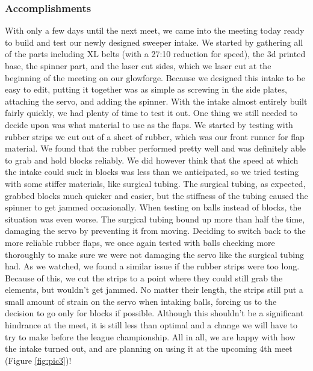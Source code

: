 \subsubsection*{Accomplishments}
With only a few days until the next meet, we came into the meeting today ready to build and test our newly designed sweeper intake. We started by gathering all of the parts including XL belts (with a 27:10 reduction for speed), the 3d printed base, the spinner part, and the laser cut sides, which we laser cut at the beginning of the meeting on our glowforge. Because we designed this intake to be easy to edit, putting it together was as simple as screwing in the side plates, attaching the servo, and adding the spinner. With the intake almost entirely built fairly quickly, we had plenty of time to test it out. One thing we still needed to decide upon was what material to use as the flaps. We started by testing with rubber strips we cut out of a sheet of rubber, which was our front runner for flap material. We found that the rubber performed pretty well and was definitely able to grab and hold blocks reliably. We did however think that the speed at which the intake could suck in blocks was less than we anticipated, so we tried testing with some stiffer materials, like surgical tubing. The surgical tubing, as expected, grabbed blocks much quicker and easier, but the stiffness of the tubing caused the spinner to get jammed occasionally. When testing on balls instead of blocks, the situation was even worse. The surgical tubing bound up more than half the time, damaging the servo by preventing it from moving. Deciding to switch back to the more reliable rubber flaps, we once again tested with balls checking more thoroughly to make sure we were not damaging the servo like the surgical tubing had. As we watched, we found a similar issue if the rubber strips were too long. Because of this, we cut the strips to a point where they could still grab the elements, but wouldn’t get jammed. No matter their length, the strips still put a small amount of strain on the servo when intaking balls, forcing us to the decision to go only for blocks if possible. Although this shouldn't be a significant hindrance at the meet, it is still less than optimal and a change we will have to try to make before the league championship. All in all, we are happy with how the intake turned out, and are planning on using it at the upcoming 4th meet (Figure \ref{fig:pic3})!


